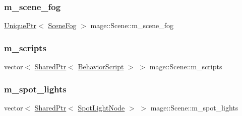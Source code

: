 \hypertarget{classmage_1_1_scene_a58f8d29322664c4c5895703a6cbc9000}{}\label{classmage_1_1_scene_a58f8d29322664c4c5895703a6cbc9000} 
\subsubsection{\texorpdfstring{m\+\_\+scene\+\_\+fog}{m\_scene\_fog}}
{\footnotesize\ttfamily \hyperlink{namespacemage_a3316d7143a973e37adf1110f2e80ca31}{Unique\+Ptr}$<$ \hyperlink{structmage_1_1_scene_fog}{Scene\+Fog} $>$ mage\+::\+Scene\+::m\+\_\+scene\+\_\+fog\hspace{0.3cm}{\ttfamily [private]}}

\hypertarget{classmage_1_1_scene_a84548bf6978f8955ce5892cb23536a4e}{}\label{classmage_1_1_scene_a84548bf6978f8955ce5892cb23536a4e} 
\subsubsection{\texorpdfstring{m\+\_\+scripts}{m\_scripts}}
{\footnotesize\ttfamily vector$<$ \hyperlink{namespacemage_a1e01ae66713838a7a67d30e44c67703e}{Shared\+Ptr}$<$ \hyperlink{classmage_1_1_behavior_script}{Behavior\+Script} $>$ $>$ mage\+::\+Scene\+::m\+\_\+scripts\hspace{0.3cm}{\ttfamily [private]}}

\hypertarget{classmage_1_1_scene_a4e1954bc0b812d6a71123ca3ac9eeb75}{}\label{classmage_1_1_scene_a4e1954bc0b812d6a71123ca3ac9eeb75} 
\subsubsection{\texorpdfstring{m\+\_\+spot\+\_\+lights}{m\_spot\_lights}}
{\footnotesize\ttfamily vector$<$ \hyperlink{namespacemage_a1e01ae66713838a7a67d30e44c67703e}{Shared\+Ptr}$<$ \hyperlink{namespacemage_aeed5dee4ff6c591eabb0e9114256df4a}{Spot\+Light\+Node} $>$ $>$ mage\+::\+Scene\+::m\+\_\+spot\+\_\+lights\hspace{0.3cm}{\ttfamily [private]}}

\hypertarget{classmage_1_1_scene_a64118c052d728ac988031898fd2d757d}{}\label{classmage_1_1_scene_a64118c052d728ac988031898fd2d757d} 
